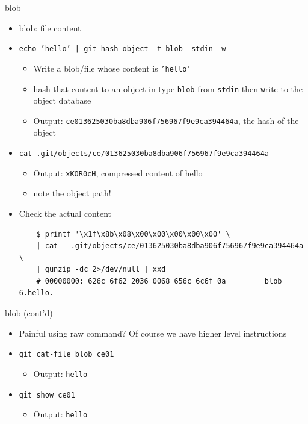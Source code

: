 \documentclass[aspectratio=169]{beamer}
\newcommand{\T}[1]{\texttt{#1}}
\begin{document}
\begin{frame}[fragile]{blob}
  \begin{itemize}
    \item<1-> blob: file content
    \item<2-> \T{echo 'hello' | git hash-object -t blob --stdin -w}\begin{itemize}
      \item Write a blob/file whose content is \T{'hello'}
      \item hash that content to an object in type \T{blob} from \T{stdin} then \T{w}rite to the object database
      \item Output: \T{ce013625030ba8dba906f756967f9e9ca394464a}, the hash of the object
    \end{itemize}
    \item<3-> \T{cat .git/objects/ce/013625030ba8dba906f756967f9e9ca394464a}\begin{itemize}
      \item Output: \T{xKOR0cH}, compressed content of hello
      \item note the object path!
    \end{itemize}
    \item<4-> Check the actual content\begin{verbatim}
    $ printf '\x1f\x8b\x08\x00\x00\x00\x00\x00' \
    | cat - .git/objects/ce/013625030ba8dba906f756967f9e9ca394464a \
    | gunzip -dc 2>/dev/null | xxd
    # 00000000: 626c 6f62 2036 0068 656c 6c6f 0a         blob 6.hello.
    \end{verbatim}
  \end{itemize}
\end{frame}

\begin{frame}{blob (cont'd)}
  \begin{itemize}
    \item Painful using raw command? Of course we have higher level instructions
    \item \T{git cat-file blob ce01}\begin{itemize}
      \item Output: \T{hello}
    \end{itemize}
    \item \T{git show ce01}\begin{itemize}
      \item Output: \T{hello}
    \end{itemize}
  \end{itemize}
\end{frame}
\end{document}

